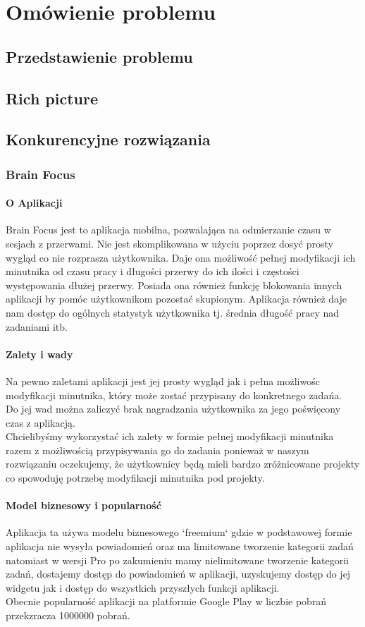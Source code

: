 \documentclass[a4paper,11pt]{report}
\begin{document}
\chapter {Omówienie problemu}
\section {Przedstawienie problemu}
\section {Rich picture}
\section {Konkurencyjne rozwiązania}
\subsection{Brain Focus}
\subsubsection{O Aplikacji}
Brain Focus jest to aplikacja mobilna, pozwalająca na odmierzanie czasu w sesjach z przerwami. Nie jest skomplikowana w użyciu poprzez dosyć prosty wygląd co nie rozprasza użytkownika. Daje ona możliwość pełnej modyfikacji ich minutnika od czasu pracy i długości przerwy do ich ilości i częstości występowania dłużej przerwy. Posiada ona również funkcję blokowania innych aplikacji by pomóc użytkownikom pozostać skupionym. Aplikacja również daje nam dostęp do ogólnych statystyk użytkownika tj. średnia długość pracy nad zadaniami itb.
\subsubsection{Zalety i wady}
Na pewno zaletami aplikacji jest jej prosty wygląd jak i pełna możliwośc modyfikacji minutnika, który może zostać przypisany do konkretnego zadańa. \vspace{0,5cm}\\Do jej wad można zaliczyć brak nagradzania użytkownika za jego poświęcony czas z aplikacją.
\vspace{0,5cm}\\Chcielibyśmy wykorzystać ich zalety w formie pełnej modyfikacji minutnika razem z możliwością przypisywania go do zadania ponieważ w naszym rozwiązaniu oczekujemy, że użytkownicy będą mieli bardzo zróżnicowane projekty co spowoduję potrzebę modyfikacji minutnika pod projekty.
\subsubsection{Model biznesowy i popularność}
Aplikacja ta używa modelu biznesowego `freemium` gdzie w podstawowej formie aplikacja nie wysyła powiadomień oraz ma limitowane tworzenie kategorii zadań natomiast w wersji Pro po zakumieniu mamy nielimitowane tworzenie kategorii zadań, dostajemy dostęp do powiadomień w aplikacji, uzyskujemy dostęp do jej widgetu jak i dostęp do wszystkich przyszłych funkcji aplikacji.
\vspace{0,5cm}\\Obecnie popularność aplikacji na platformie Google Play w liczbie pobrań przekzracza 1000000 pobrań.
\end{document}
